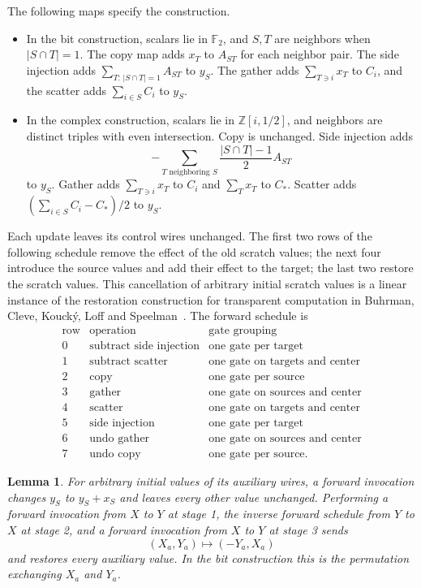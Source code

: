 \documentclass[11pt]{article}
\newtheorem{lemma}[theorem]{Lemma}
\theoremstyle{definition}
\begin{document}
The following maps specify the construction.
\begin{itemize}
\item In the bit construction, scalars lie in $\mathbb F_2$, and
$S,T$ are neighbors when $|S\cap T|=1$.
The copy map adds $x_T$ to $A_{ST}$ for each neighbor pair.
The side injection adds $\sum_{T:\,|S\cap T|=1}A_{ST}$ to $y_S$.
The gather adds $\sum_{T\ni i}x_T$ to $C_i$, and the scatter adds
$\sum_{i\in S}C_i$ to $y_S$.
\item In the complex construction, scalars lie in
$\mathbb Z[i,1/2]$, and neighbors are distinct triples with even
intersection.  Copy is unchanged.  Side injection adds
\[
 -\sum_{T\text{ neighboring }S}\frac{|S\cap T|-1}{2}A_{ST}
\]
to $y_S$.  Gather adds $\sum_{T\ni i}x_T$ to $C_i$ and
$\sum_Tx_T$ to $C_\ast$.  Scatter adds
$(\sum_{i\in S}C_i-C_\ast)/2$ to $y_S$.
\end{itemize}
Each update leaves its control wires unchanged.  The first two rows of
the following schedule remove the effect of the old scratch values;
the next four introduce the source values and add their effect to the
target; the last two restore the scratch values.
This cancellation of arbitrary initial scratch values is a linear
instance of the restoration construction for transparent computation in
Buhrman, Cleve, Kouck\'y, Loff and Speelman~\cite[Section~3]{BuhrmanCleveKouckyLoffSpeelman2014}.
The forward schedule is
\begin{equation}
\begin{array}{c|l|l}
\text{row}&\text{operation}&\text{gate grouping}\\ \hline
0&\text{subtract side injection}&\text{one gate per target}\\
1&\text{subtract scatter}&\text{one gate on targets and center}\\
2&\text{copy}&\text{one gate per source}\\
3&\text{gather}&\text{one gate on sources and center}\\
4&\text{scatter}&\text{one gate on targets and center}\\
5&\text{side injection}&\text{one gate per target}\\
6&\text{undo gather}&\text{one gate on sources and center}\\
7&\text{undo copy}&\text{one gate per source}.
\end{array}
\label{eq:motif-schedule}
\end{equation}

\begin{lemma}\label{lem:scalar-motifs}
For arbitrary initial values of its auxiliary wires, a forward
invocation changes $y_S$ to $y_S+x_S$ and leaves every other value
unchanged.  Performing a forward invocation from $X$ to $Y$ at stage 1,
the inverse forward schedule from $Y$ to $X$ at stage 2, and a forward
invocation from $X$ to $Y$ at stage 3 sends
\[
 (X_a,Y_a)\longmapsto(-Y_a,X_a)
\]
and restores every auxiliary value.  In the bit construction this is the
permutation exchanging $X_a$ and $Y_a$.
\end{lemma}
\end{document}
